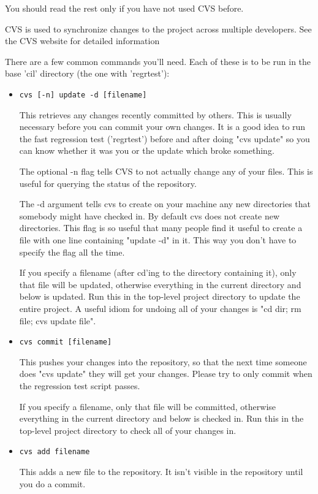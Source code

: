 \documentclass{article}
\def\t#1{{\tt #1}}
\begin{document}
 You should read the rest only if you have not used CVS before. 

 CVS is used to synchronize changes to the project across multiple
developers.  See the CVS website for detailed information

  
There are a few common commands you'll need.  Each of these is to be run
in the base 'cil' directory (the one with 'regrtest'):

\begin{itemize}
\item \t{cvs [-n] update -d [filename]}

    This retrieves any changes recently committed by others.  This is
    usually necessary before you can commit your own changes.  It is a
    good idea to run the fast regression test ('regrtest') before and
    after doing "cvs update" so you can know whether it was you or the
    update which broke something.

    The optional -n flag tells CVS to not actually change any of your
    files.  This is useful for querying the status of the repository.

    The -d argument tells cvs to create on your machine any new directories
    that somebody might have checked in. By default cvs does not create new
    directories. This flag is so useful that many people find it useful to
    create a  file with one line containing "update -d" in it.
    This way you don't have to specify the flag all the time.

    If you specify a filename (after cd'ing to the directory containing it),
    only that file will be updated, otherwise everything in the current
    directory and below is updated. Run this in the top-level project
    directory to update the entire project. A useful idiom for undoing all of
    your changes is "cd dir; rm file; cvs update file".

    
\item \t{cvs commit [filename]}

    This pushes your changes into the repository, so that the next time
    someone does "cvs update" they will get your changes.  Please try to
    only commit when the regression test script passes.
    
    If you specify a filename, only that file will be committed, otherwise
    everything in the current directory and below is checked in. Run this in
    the top-level project directory to check all of your changes in.

\item  \t{cvs add filename}

    This adds a new file to the repository.  It isn't visible in the
    repository until you do a commit.
\end{itemize}
\end{document}
